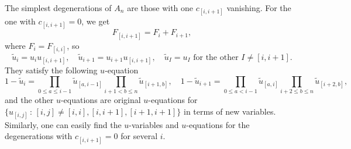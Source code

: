 \documentclass[hidelinks,12pt]{article}
\begin{document}
The simplest degenerations of $A_n$ are those with one $c_{[i,i+1]}$ vanishing. For the one with $c_{[i,i+1]}=0$, we get 
\[
	F_{[i,i+1]}=F_{i}+F_{i+1},
\]
where $F_i=F_{[i,i]}$, so 
\[
	\tilde u_{i}=u_{i} u_{[i,i+1]},\quad 
	\tilde u_{i+1}=u_{i+1} u_{[i,i+1]},\quad 
	\tilde u_I=u_I \text{ for the other $I\neq [i,i+1]$}.
\]
They satisfy the following $u$-equation
\[
	1-\tilde u_{i}=\prod_{0\leq a\leq i-1}\tilde u_{[a,i-1]}
	\prod_{i+1< b\leq n} \tilde u_{[i+1,b]},\quad 
	1-\tilde u_{i+1}=\prod_{0\leq a <i-1} \tilde u_{[a,i]}
	\prod_{i+2\leq b\leq n} \tilde u_{[i+2,b]},\quad 
\]
and the other $u$-equations are original $u$-equations for
$\{u_{[i,j]}\,:\, [i,j]\neq [i,i],[i,i+1],[i+1,i+1]\}$ in terms of new variables. Similarly, one can easily find the $u$-variables and $u$-equations for the degenerations with $c_{[i,i+1]}=0$ for several $i$.

\end{document}
